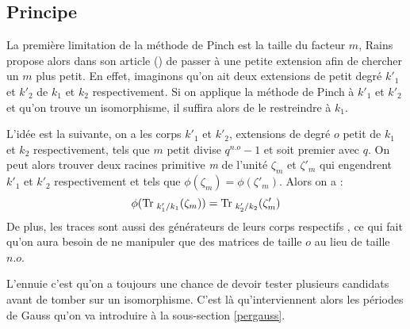 \documentclass[a4paper]{article} %
\numberwithin{section}{part}
\numberwithin{equation}{section}
\newcommand\nroot[1]{\textit{#1}\up{\textit{ième}}}
\begin{document}
\subsection{Principe}
La première limitation de la méthode de Pinch est la taille du facteur
$m$, Rains propose alors dans son article (\cite{Rai}) de passer à une petite
extension afin de chercher un $m$ plus petit. En effet, imaginons qu'on ait deux
extensions de petit degré $k'_1$ et $k'_2$ de $k_1$ et $k_2$ respectivement. Si
on applique la méthode de Pinch à $k'_1$ et $k'_2$ et qu'on trouve un
isomorphisme, il suffira alors de le restreindre à $k_1$.\par
\vspace{0.3cm}
L'idée est la suivante, on a les corps $k'_1$ et $k'_2$, extensions de degré $o$
petit de $k_1$ et $k_2$ respectivement, tels que $m$ petit divise $q^{n.o} -
1$ et soit premier avec $q$. On peut alors trouver deux racines primitive
\nroot{m} de l'unité $\zeta_{m}$ et $\zeta'_m$ qui engendrent $k'_1$ et $k'_2$
respectivement et tels que $\phi(\zeta_m) = \phi(\zeta'_m)$. Alors on a : 
\[\phi(\textup{Tr\;}_{k'_1/k_1}(\zeta_{m})) =
\textup{Tr\;}_{k'_2/k_2}(\zeta'_{m})\]
De plus, les traces sont aussi des générateurs de leurs corps respectifs %
, ce qui fait qu'on aura besoin de ne manipuler que des matrices de taille $o$ 
au lieu de taille $n.o$.\par %
L'ennuie c'est qu'on a toujours une chance de devoir tester plusieurs candidats
avant de tomber sur un isomorphisme. C'est là qu'interviennent alors les
périodes de Gauss qu'on va introduire à la sous-section \ref{pergauss}.

\vspace{0.3cm}
\end{document}
